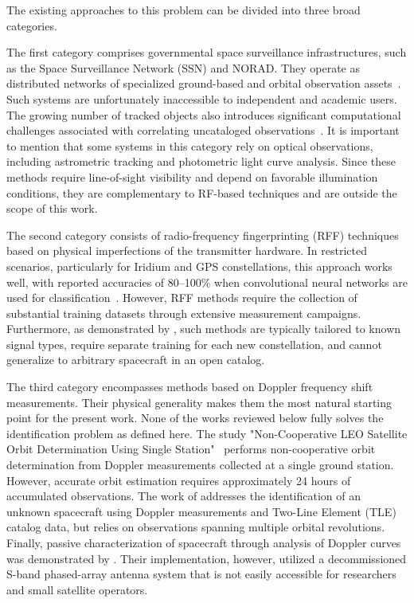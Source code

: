 \documentclass[lineno,pdflatex,sn-basic,referee,]{sn-jnl}
\begin{document}
The existing approaches to this problem can be divided into three broad categories.

The first category comprises governmental space surveillance infrastructures, such as the Space Surveillance Network (SSN) and NORAD. They operate as distributed networks of specialized ground-based and orbital observation assets~\citep{kelso_ssn}. Such systems are unfortunately inaccessible to independent and academic users. The growing number of tracked objects also introduces significant computational challenges associated with correlating uncataloged observations~\citep{phillion2014}. It is important to mention that some systems in this category rely on optical observations, including astrometric tracking and photometric light curve analysis. Since these methods require line-of-sight visibility and depend on favorable illumination conditions, they are complementary to RF-based techniques and are outside the scope of this work.

The second category consists of radio-frequency fingerprinting (RFF) techniques based on physical imperfections of the transmitter hardware. In restricted scenarios, particularly for Iridium and GPS constellations, this approach works well, with reported accuracies of 80--100\% when convolutional neural networks are used for classification~\citep{oligeri2020,orbid2025}. However, RFF methods require the collection of substantial training datasets through extensive measurement campaigns. Furthermore, as demonstrated by \citet{orbid2025}, such methods are typically tailored to known signal types, require separate training for each new constellation, and cannot generalize to arbitrary spacecraft in an open catalog.

The third category encompasses methods based on Doppler frequency shift measurements. Their physical generality makes them the most natural starting point for the present work. None of the works reviewed below fully solves the identification problem as defined here. The study "Non-Cooperative LEO Satellite Orbit Determination Using Single Station"~\citep{deng2024} performs non-cooperative orbit determination from Doppler measurements collected at a single ground station. However, accurate orbit estimation requires approximately 24 hours of accumulated observations. The work of \citet{spiridonov2021} addresses the identification of an unknown spacecraft using Doppler measurements and Two-Line Element (TLE) catalog data, but relies on observations spanning multiple orbital revolutions. Finally, passive characterization of spacecraft through analysis of Doppler curves was demonstrated by \citet{richmond2018}. Their implementation, however, utilized a decommissioned S-band phased-array antenna system that is not easily accessible for researchers and small satellite operators.
\end{document}
